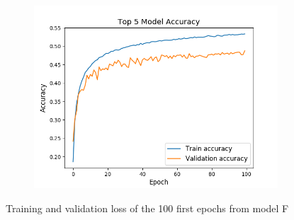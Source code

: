 \begin{figure}[!h]
\begin{subfigure}[b]{0.32\textwidth}
            \centering
            \includegraphics[width=\textwidth]{images/adam_final_no_fc_100batch_top5.png}
            \caption[]%
            {{\small }}
        \end{subfigure}
        \caption[]
        {\small Training and validation loss of the 100 first epochs from model F}
    \end{figure}
